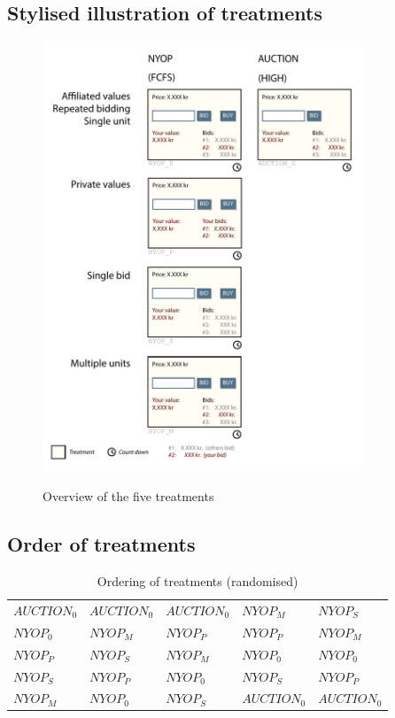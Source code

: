 \documentclass[a4paper,12pt]{article}
\begin{document}
	\newpage
	\subsection{Stylised illustration of treatments}
	\label{app:stylised_treatments}
	
	\begin{figure}[h]
	        \centering
	        \caption{Overview of the five treatments}
	        \includegraphics[width=0.85\textwidth]{Figures/Treatments}
			\label{fig:treatments}
	\end{figure}
	
	\newpage
	
	\subsection{Order of treatments}
	\label{app:order_treatments}
	
	\begin{table}[ht]
		\caption{Ordering of treatments (randomised)}
		\begin{tabular}{l | l | l | l | l}
			$AUCTION_0$	& $AUCTION_0$ 	& $AUCTION_0$ 	& $NYOP_M$ 		& $NYOP_S$ 	\\
			$NYOP_0$ 	& $NYOP_M$		& $NYOP_P$		& $NYOP_P$		& $NYOP_M$	\\
			$NYOP_P$ 	& $NYOP_S$		& $NYOP_M$		& $NYOP_0$		& $NYOP_0$	\\
			$NYOP_S$	& $NYOP_P$		& $NYOP_0$		& $NYOP_S$		& $NYOP_P$	\\
			$NYOP_M$	& $NYOP_0$		& $NYOP_S$		& $AUCTION_0$	& $AUCTION_0$	
		\end{tabular}
		\label{tab:order}
	\end{table}
	
\end{document}
